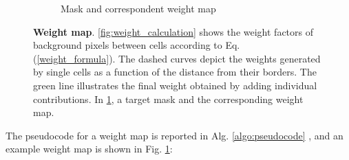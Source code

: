 \begin{figure}
{\begin{subfigure}[]{0.62\textwidth}
         \caption{Mask and correspondent weight map}
         \label{fig:weight_map_example}
     \end{subfigure}
}
\caption{\textbf{Weight map}. 
\ref{fig:weight_calculation} shows the weight factors of background pixels between cells according to Eq. (\ref{weight_formula}). The dashed curves depict the weights generated by single cells as a function of the distance from their borders.
The green line illustrates the final weight obtained by adding individual contributions. 
In \ref{fig:weight_map_example}, a target mask and the corresponding weight map.} 
\label{fig:weight_map}
\end{figure}
The pseudocode for a weight map is reported in Alg. \ref{algo:pseudocode} 
, and an example weight map is shown in Fig. \ref{fig:weight_map_example}:

